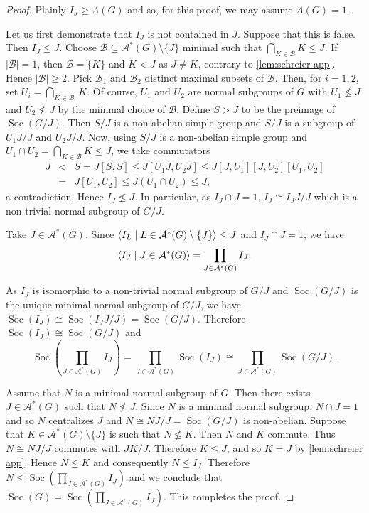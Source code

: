 \documentclass[12pt,a4paper]{amsart}
\DeclareMathOperator{\Soc}{Soc}
\DeclarePairedDelimiter{\gen}{\langle}{\rangle}
\begin{document}
\begin{proof} Plainly $I_J\ge A(G)$ and so, for this proof, we may assume $A(G)=1$.

Let us first demonstrate that $I_J$ is not contained in $J$. Suppose that this is false. Then $I_J \le J$. Choose $\mathcal B \subseteq\mathcal A^*(G)\setminus\{J\}$ minimal such that $ \bigcap_{K\in \mathcal B}K\le J$. If $|\mathcal B| =1$, then $\mathcal B=\{K\}$ and $K<J$ as $J \ne K$, contrary to \cref{lem:schreier app}. Hence $|\mathcal B| \ge 2$. Pick $\mathcal B_1$ and $\mathcal B_2$ distinct maximal subsets of $\mathcal B$. Then, for $i=1, 2$, set $U_i=  \bigcap_{K\in \mathcal B_i}K$. Of course, $U_1$ and $U_2$ are normal subgroups of $G$ with  $U_1\not \le J$ and $U_2\not \le J$ by the minimal choice of $\mathcal B$. Define $S>J$ to be the preimage of $\Soc(G/J)$. Then $S/J$ is a non-abelian simple group and  $S/J$ is a subgroup of  $U_1J/J$ and $U_2J/J$.  Now, using $S/J$ is a non-abelian simple group and $U_1\cap U_2=\bigcap_{K\in \mathcal B}K\le J$, we take commutators  \begin{eqnarray*}J&<&S =J[S,S]\le J[U_1J,U_2J]\le  J[J,U_1][J,U_2][U_1,U_2]\\&=& J[U_1,U_2] \le J(U_1\cap U_2)\le J,\end{eqnarray*} a contradiction. Hence $I_J \not \le J$. In particular, as $I_J \cap J=1$, $I_J\cong I_JJ/J$ which is a non-trivial normal subgroup of $G/J$.


Take $J\in \mathcal A^*(G)$. Since $\gen{I_L\mid L\in \mathcal A^*(G)\setminus\{J\}} \le J$ and $I_J \cap J=  1$,
we have $$\gen{I_J\mid J\in \mathcal A^*(G)} =\prod_{J\in \mathcal A^*(G)}I_J.$$

As   $I_J$ is isomorphic to a non-trivial normal subgroup of $G/J$ and $\Soc(G/J)$ is the unique minimal normal subgroup of $G/J$, we have $\Soc(I_J) \cong \Soc(I_JJ/J)= \Soc(G/J)$. Therefore $\Soc(I_J) \cong \Soc(G/J)$ and  $$\Soc(\prod_{J\in \mathcal A^*(G)}I_J) =\prod_{J\in \mathcal A^*(G)}\Soc(I_J)\cong \prod_{J\in \mathcal A ^*(G)}\Soc(G/J).$$

Assume that $N$ is a minimal normal subgroup of $G$. Then there exists $J\in \mathcal A^*(G)$ such that $N \not \le J$. Since $N$ is a minimal normal subgroup, $N\cap J=1$ and so $N$ centralizes $J$ and $N \cong NJ/J= \Soc(G/J)$ is non-abelian. Suppose that $K\in \mathcal A^*(G)\setminus \{J\}$ is such that $N \not \le K$. Then $N$ and $K$ commute. Thus $N\cong NJ/J$ commutes with $JK/J$. Therefore $K \le J$, and so $K=J$ by \cref{lem:schreier app}. Hence $N \le K$ and consequently $N\le I_J $. Therefore $N \le \Soc(\prod_{J\in \mathcal A^*(G)}I_J)$ and we conclude that $\Soc(G)=\Soc(\prod_{J\in \mathcal A^*(G)}I_J)$. This completes the proof.
\end{proof}
\end{document}

